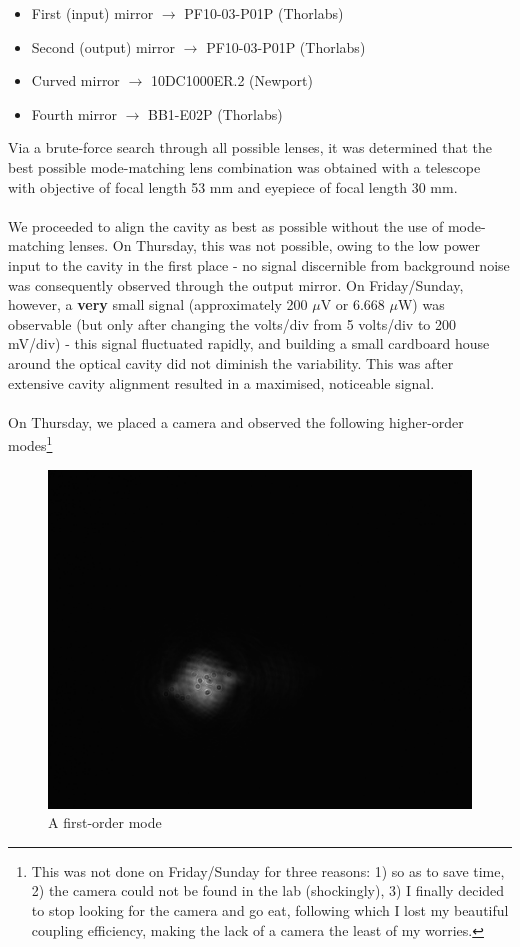 \documentclass[10pt,a4paper]{article}
\begin{document}
\begin{itemize}
\item First (input) mirror $\longrightarrow$ PF10-03-P01P (Thorlabs)
\item Second (output) mirror $\longrightarrow$ PF10-03-P01P (Thorlabs)
\item Curved mirror $\longrightarrow$ 10DC1000ER.2 (Newport)
\item Fourth mirror $\longrightarrow$ BB1-E02P (Thorlabs)
\end{itemize}
Via a brute-force search through all possible lenses, it was determined that the best possible mode-matching lens combination was obtained with a telescope with objective of focal length 53 mm and eyepiece of focal length 30 mm.\\
\\
We proceeded to align the cavity as best as possible without the use of mode-matching lenses. On Thursday, this was not possible, owing to the low power input to the cavity in the first place - no signal discernible from background noise was consequently observed through the output mirror. On Friday/Sunday, however, a \textbf{very} small signal (approximately 200 $\mu$V or 6.668 $\mu$W) was observable (but only after changing the volts/div from 5 volts/div to 200 mV/div) - this signal fluctuated rapidly, and building a small cardboard house around the optical cavity did not diminish the variability. This was after extensive cavity alignment resulted in a maximised, noticeable signal.\\
\\
On Thursday, we placed a camera and observed the following higher-order modes\footnote{This was not done on Friday/Sunday for three reasons: 1) so as to save time, 2) the camera could not be found in the lab (shockingly), 3) I finally decided to stop looking for the camera and go eat, following which I lost my beautiful coupling efficiency, making the lack of a camera the least of my worries.}
\begin{figure}[H]
\centering
\includegraphics[width=\textwidth]{../Analysis/Lab5Mode8.png}
\caption{A first-order mode}
\end{figure}
\end{document}
